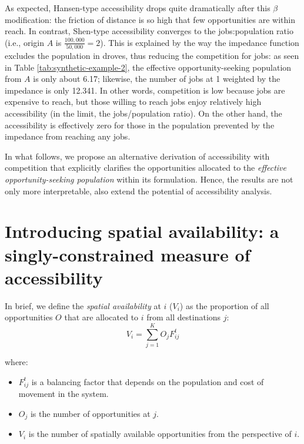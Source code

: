 \documentclass[]{elsarticle} %
\providecommand{\tightlist}{%
  \setlength{\itemsep}{0pt}\setlength{\parskip}{0pt}}
\begin{document}
\begin{table}[ht]
\end{table}
 

As expected, Hansen-type accessibility drops quite dramatically after
this \(\beta\) modification: the friction of distance is so high that
few opportunities are within reach. In contrast, Shen-type accessibility
converges to the jobs:population ratio (i.e., origin \(A\) is
\(\frac{100,000}{50,000} = 2\)). This is explained by the way the
impedance function excludes the population in droves, thus reducing the
competition for jobs: as seen in Table \ref{tab:synthetic-example-2},
the effective opportunity-seeking population from \(A\) is only about
6.17; likewise, the number of jobs at 1 weighted by the impedance is
only 12.341. In other words, competition is low because jobs are
expensive to reach, but those willing to reach jobs enjoy relatively
high accessibility (in the limit, the jobs/population ratio). On the
other hand, the accessibility is effectively zero for those in the
population prevented by the impedance from reaching any jobs.

In what follows, we propose an alternative derivation of
\citet{shen1998} accessibility with competition that explicitly
clarifies the opportunities allocated to the \emph{effective
opportunity-seeking population} within its formulation. Hence, the
results are not only more interpretable, also extend the potential of
accessibility analysis.

\hypertarget{introducing-spatial-availability-a-singly-constrained-measure-of-accessibility}{%
\section{Introducing spatial availability: a singly-constrained measure
of
accessibility}\label{introducing-spatial-availability-a-singly-constrained-measure-of-accessibility}}

In brief, we define the \emph{spatial availability} at \(i\) (\(V_{i}\))
as the proportion of all opportunities \(O\) that are allocated to \(i\)
from all destinations \(j\): \[
V_i = \sum_{j=1}^KO_jF^t_{ij}
\]

\noindent where:

\begin{itemize}
\tightlist
\item
  \(F^t_{ij}\) is a balancing factor that depends on the population and
  cost of movement in the system.
\item
  \(O_j\) is the number of opportunities at \(j\).
\item
  \(V_i\) is the number of spatially available opportunities from the
  perspective of \(i\).
\end{itemize}
\end{document}
